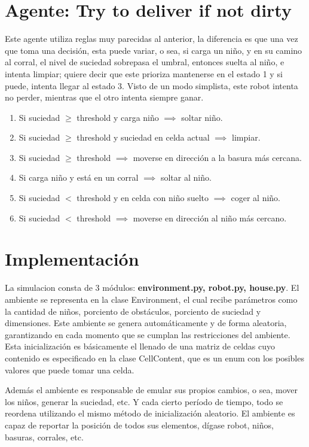 \documentclass[a4paper, 12pt]{article}
\begin{document}
\section*{Agente: Try to deliver if not dirty}
Este agente utiliza reglas muy parecidas al anterior, la diferencia es que una vez que toma una decisi\'on, esta
puede variar, o sea, si carga un niño, y en su camino al corral, el nivel de suciedad sobrepasa el umbral, entonces
suelta al niño, e intenta limpiar; quiere decir que este prioriza mantenerse en el estado 1 y si puede, intenta llegar
al estado 3. Visto de un modo simplista, este robot intenta no perder, mientras que el otro intenta siempre ganar.

\begin{enumerate}
  \item Si suciedad $\ge$ threshold y carga niño $\implies$ soltar niño.
  \item Si suciedad $\ge$ threshold y suciedad en celda actual $\implies$ limpiar.
  \item Si suciedad $\ge$ threshold $\implies$ moverse en direcci\'on a la basura m\'as cercana.
  \item Si carga niño y est\'a en un corral $\implies$ soltar al niño.
  \item Si suciedad $<$ threshold y en celda con niño suelto $\implies$ coger al niño.
  \item Si suciedad $<$ threshold $\implies$ moverse en direcci\'on al niño m\'as cercano.
\end{enumerate}

\section*{Implementaci\'on}
La simulacion consta de 3 m\'odulos: \textbf{environment.py, robot.py, house.py}. El ambiente se representa en 
la clase Environment, el cual recibe par\'ametros como la cantidad de niños, porciento de obst\'aculos, porciento de
suciedad y dimensiones. Este ambiente se genera autom\'aticamente y de forma aleatoria, garantizando en cada momento
que se cumplan las restricciones del ambiente. Esta inicializaci\'on es b\'asicamente el llenado de una matriz de celdas
cuyo contenido es especificado en la clase CellContent, que es un enum con los posibles valores que puede tomar una celda.

Adem\'as el ambiente es responsable de emular sus propios cambios, o sea, mover los niños, generar la suciedad, etc. Y cada
cierto per\'iodo de tiempo, todo se reordena utilizando el mismo m\'etodo de inicializaci\'on aleatorio. El ambiente es capaz
de reportar la posici\'on de todos sus elementos, d\'igase robot, niños, basuras, corrales, etc.
\end{document}
